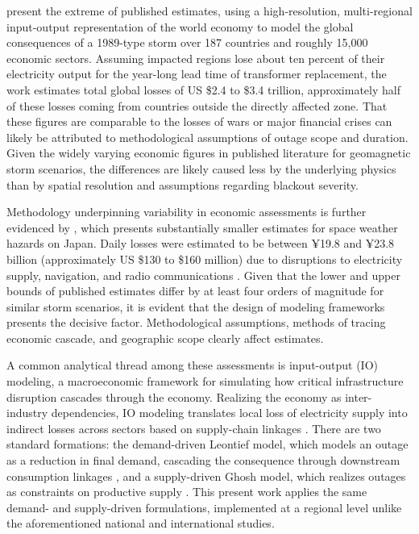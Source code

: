 \documentclass[draft]{agujournal2019}
\begin{document}
 present the extreme of published estimates, using a high-resolution, multi-regional input-output representation of the world economy to model the global consequences of a 1989-type storm over 187 countries and roughly 15,000 economic sectors. Assuming impacted regions lose about ten percent of their electricity output for the year-long lead time of transformer replacement, the work estimates total global losses of US \$2.4 to \$3.4 trillion, approximately half of these losses coming from countries outside the directly affected zone. That these figures are comparable to the losses of wars or major financial crises can likely be attributed to methodological assumptions of outage scope and duration. Given the widely varying economic figures in published literature for geomagnetic storm scenarios, the differences are likely caused less by the underlying physics than by spatial resolution and assumptions regarding blackout severity. 

Methodology underpinning variability in economic assessments is further evidenced by , which presents substantially smaller estimates for space weather hazards on Japan. Daily losses were estimated to be between ¥19.8 and ¥23.8 billion (approximately US \$130 to \$160 million) due to disruptions to electricity supply, navigation, and radio communications \cite{Ishii2021}. Given that the lower and upper bounds of published estimates differ by at least four orders of magnitude for similar storm scenarios, it is evident that the design of modeling frameworks presents the decisive factor. Methodological assumptions, methods of tracing economic cascade, and geographic scope clearly affect estimates. 

A common analytical thread among these assessments is input-output (IO) modeling, a macroeconomic framework for simulating how critical infrastructure disruption cascades through the economy. Realizing the economy as inter-industry dependencies, IO modeling translates local loss of electricity supply into indirect losses across sectors based on supply-chain linkages \cite{GALBUSERA2018186, SUEWING2020104756, Koks2019}. There are two standard formations: the demand-driven Leontief model, which models an outage as a reduction in final demand, cascading the consequence through downstream consumption linkages \cite{MillerBlair2009}, and a supply-driven Ghosh model, which realizes outages as constraints on productive supply \cite{Ghosh1958}. This present work applies the same demand- and supply-driven formulations, implemented at a regional level unlike the aforementioned national and international studies. 
\end{document}
